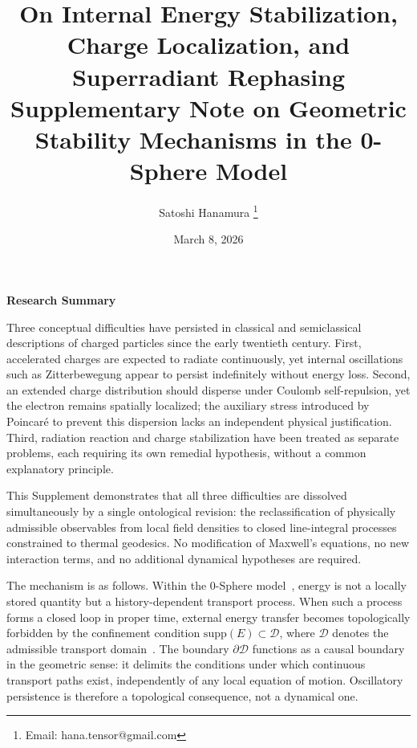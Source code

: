 \documentclass[12pt,a4paper]{article}
\begin{document}
\title{On Internal Energy Stabilization, Charge Localization, and Superradiant Rephasing\\
\normalsize Supplementary Note on Geometric Stability Mechanisms in the 0-Sphere Model}

\author{Satoshi Hanamura
\thanks{Email: hana.tensor@gmail.com}}
\date{March 8, 2026}

\maketitle

\tableofcontents
\clearpage


\begin{center}
\textbf{Research Summary}
\end{center}

\justifying

Three conceptual difficulties have persisted in classical and semiclassical descriptions of charged particles since the early twentieth century. First, accelerated charges are expected to radiate continuously, yet internal oscillations such as Zitterbewegung appear to persist indefinitely without energy loss. Second, an extended charge distribution should disperse under Coulomb self-repulsion, yet the electron remains spatially localized; the auxiliary stress introduced by Poincar\'e to prevent this dispersion lacks an independent physical justification. Third, radiation reaction and charge stabilization have been treated as separate problems, each requiring its own remedial hypothesis, without a common explanatory principle.

This Supplement demonstrates that all three difficulties are dissolved simultaneously by a single ontological revision: the reclassification of physically admissible observables from local field densities to closed line-integral processes constrained to thermal geodesics. No modification of Maxwell's equations, no new interaction terms, and no additional dynamical hypotheses are required.

The mechanism is as follows. Within the 0-Sphere model~\cite{hanamura16759284}, energy is not a locally stored quantity but a history-dependent transport process. When such a process forms a closed loop in proper time, external energy transfer becomes topologically forbidden by the confinement condition $\mathrm{supp}(E) \subset \mathcal{D}$, where $\mathcal{D}$ denotes the admissible transport domain~\cite{hanamura18356895}. The boundary $\partial\mathcal{D}$ functions as a causal boundary in the geometric sense: it delimits the conditions under which continuous transport paths exist, independently of any local equation of motion. Oscillatory persistence is therefore a topological consequence, not a dynamical one.
\end{document}
